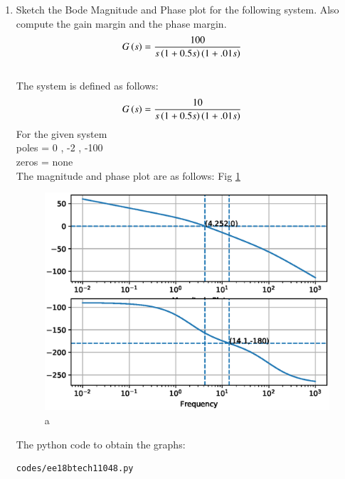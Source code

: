 \begin{enumerate}[label=\thesection.\arabic*.,ref=\thesection.\theenumi]

\item Sketch the Bode Magnitude and Phase plot for the following system. Also compute the gain margin and the phase margin.
\begin{align}
G\left(s\right) &= \frac{100}{s\left(1+0.5s\right)\left(1+.01s\right)}
\label{eq:ee18btech11048_2}
\end{align}
\\
\solution 
The system is defined as follows:
\begin{align}
G\left(s\right) &= \frac{10}{s\left(1+0.5s\right)\left(1+.01s\right)}
\end{align}
For the given system\\
poles = 0 , -2 , -100\\
zeros = none\\
The magnitude and phase plot are as follows: Fig  \ref{fig:ee18btech11048} 
\begin{figure}[!h]
\centering
  \includegraphics[width=\columnwidth]{./figs/ee18btech11048.eps}
  \caption{a}
  \label{fig:ee18btech11048}
\end{figure}

The python code to obtain the graphs:

\begin{lstlisting}
codes/ee18btech11048.py
\end{lstlisting}


\end{enumerate}
